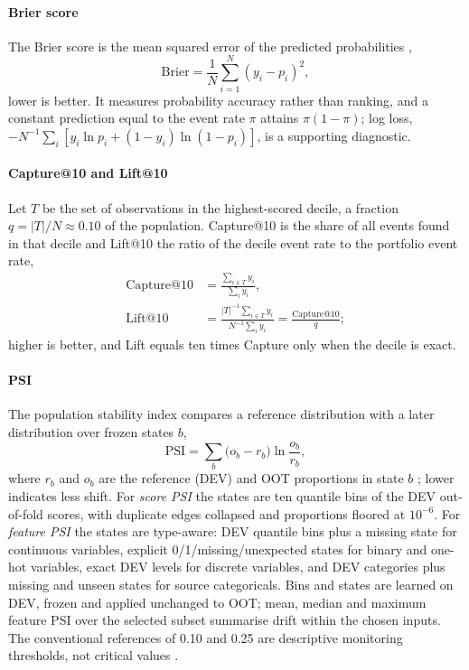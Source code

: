\documentclass[final,5p,twocolumn]{elsarticle}
\newcommand{\PSI}{\mathrm{PSI}}
\begin{document}
\paragraph{Brier score}
The Brier score is the mean squared error of the predicted probabilities \cite{brier1950},
\begin{equation}
    \mathrm{Brier}=\frac{1}{N}\sum_{i=1}^{N}(y_i-p_i)^2 ,
    \label{eq:brier}
\end{equation}
lower is better. It measures probability accuracy rather than ranking, and a constant prediction equal to the event rate $\pi$ attains $\pi(1-\pi)$; log loss, $-N^{-1}\sum_i[y_i\ln p_i+(1-y_i)\ln(1-p_i)]$, is a supporting diagnostic.

\paragraph{Capture@10 and Lift@10}
Let $T$ be the set of observations in the highest-scored decile, a fraction $q=|T|/N\approx0.10$ of the population. Capture@10 is the share of all events found in that decile and Lift@10 the ratio of the decile event rate to the portfolio event rate,
\begin{equation}
\begin{aligned}
    \mathrm{Capture@10}&=\frac{\sum_{i\in T}y_i}{\sum_{i}y_i},\\
    \mathrm{Lift@10}&=\frac{|T|^{-1}\sum_{i\in T}y_i}{N^{-1}\sum_{i}y_i}=\frac{\mathrm{Capture@10}}{q};
\end{aligned}
    \label{eq:capture10}
\end{equation}
higher is better, and Lift equals ten times Capture only when the decile is exact.

\paragraph{PSI}
The population stability index compares a reference distribution with a later distribution over frozen states $b$,
\begin{equation}
    \PSI=\sum_{b}\big(o_b-r_b\big)\ln\frac{o_b}{r_b},
    \label{eq:psi}
\end{equation}
where $r_b$ and $o_b$ are the reference (DEV) and OOT proportions in state $b$ \cite{siddiqi2006,yurdakul2020}; lower indicates less shift. For \emph{score PSI} the states are ten quantile bins of the DEV out-of-fold scores, with duplicate edges collapsed and proportions floored at $10^{-6}$. For \emph{feature PSI} the states are type-aware: DEV quantile bins plus a missing state for continuous variables, explicit 0/1/missing/unexpected states for binary and one-hot variables, exact DEV levels for discrete variables, and DEV categories plus missing and unseen states for source categoricals. Bins and states are learned on DEV, frozen and applied unchanged to OOT; mean, median and maximum feature PSI over the selected subset summarise drift within the chosen inputs. The conventional references of 0.10 and 0.25 are descriptive monitoring thresholds, not critical values \cite{yurdakul2020}.
\end{document}
